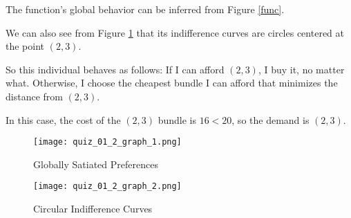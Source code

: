 \documentclass{article}
\begin{document}
The function's global behavior can be inferred from Figure \ref{func}.

We can also see from Figure \ref{ics} that its indifference curves are circles centered at the point $(2, 3)$.

So this individual behaves as follows: If I can afford $(2, 3)$, I buy it, no matter what. Otherwise, I choose the cheapest bundle I can afford that minimizes the distance from $(2, 3)$.

In this case, the cost of the $(2, 3)$ bundle is $16 < 20$, so the demand is $(2, 3)$.

\begin{figure}[htbp]
\centering
\texttt{[image: quiz\_01\_2\_graph\_1.png]}
\caption{Globally Satiated Preferences}
\label{func}

\texttt{[image: quiz\_01\_2\_graph\_2.png]}
\caption{Circular Indifference Curves}
\label{ics}
\end{figure}
\end{document}
